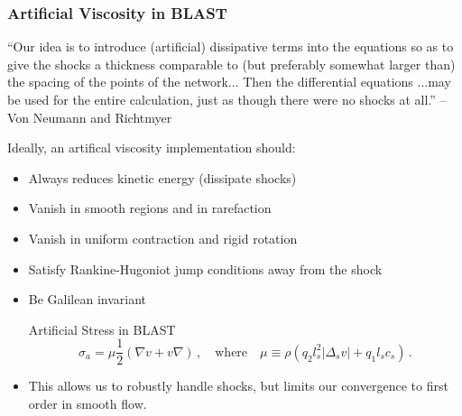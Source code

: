 \documentclass[8pt,xcolor=svgnames]{beamer}
\begin{document}
\begin{frame}\frametitle{Artificial Viscosity in BLAST}
\begin{block}{}
{\small``Our idea is to introduce (artificial) dissipative terms into the
equations so as to give the shocks a thickness comparable to (but preferably
somewhat larger than) the spacing of the points of the network... Then the
differential equations ...may be used for the entire calculation, just as
though there were no shocks at all.'' -- Von Neumann and Richtmyer}\\
\end{block}
\bigskip

Ideally, an artifical viscosity implementation should:
\begin{itemize}
  \item Always reduces kinetic energy (dissipate shocks)
  \item Vanish in smooth regions and in rarefaction
  \item Vanish in uniform contraction and rigid rotation
  \item Satisfy Rankine-Hugoniot jump conditions away from the shock
  \item Be Galilean invariant

\bigskip
\begin{block}{Artificial Stress in BLAST}
\[
\sigma_a = \mu\frac{1}{2}(\nabla v+v\nabla)\,,\quad\text{where}\quad
\mu\equiv\rho(q_2l_s^2|\Delta_sv|+q_1l_sc_s)\,.
\]
\end{block}
\item This allows us to robustly handle shocks, but limits our convergence to first order in smooth flow.
\end{itemize}
\end{frame}
\end{document}
